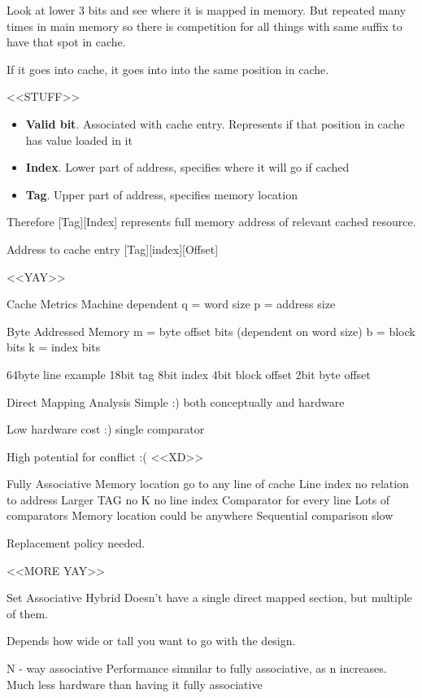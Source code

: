 \documentclass{article}
\begin{document}
		Look at lower 3 bits and see where it is mapped in memory. But repeated many times in main memory so there is competition for all things with same suffix to have that spot in cache.

		If it goes into cache, it goes into into the same position in cache.


	<<STUFF>>
		\begin{itemize}
			\item \textbf{Valid bit}. Associated with cache entry. Represents if that position in cache has value loaded in it
			\item \textbf{Index}. Lower part of address, specifies where it will go if cached
			\item \textbf{Tag}. Upper part of address, specifies memory location
		\end{itemize}

		Therefore [Tag][Index] represents full memory address of relevant cached resource.

	Address to cache entry
		[Tag][index][Offset]

		<<YAY>>

	Cache Metrics
		Machine dependent
			q = word size
			p = address size

		Byte Addressed Memory
			m = byte offset bits (dependent on word size)
			b = block bits
			k = index bits

		64byte line example
			18bit tag
			8bit index
			4bit block offset
			2bit byte offset

	Direct Mapping Analysis
		Simple :) 
			both conceptually and hardware

		Low hardware cost :)
			single comparator

		High potential for conflict :(
			<<XD>>


Fully Associative
	Memory location go to any line of cache
	Line index no relation to address
		Larger TAG
		no K
		no line index
	Comparator for every line
		Lots of comparators
		Memory location could be anywhere
		Sequential comparison slow

	Replacement policy needed.

	<<MORE YAY>>

Set Associative
	Hybrid
		Doesn't have a single direct mapped section, but multiple of them.

	Depends how wide or tall you want to go with the design.

N - way associative
	Performance simnilar to fully associative, as n increases.
	Much less hardware than having it fully associative
\end{document}
